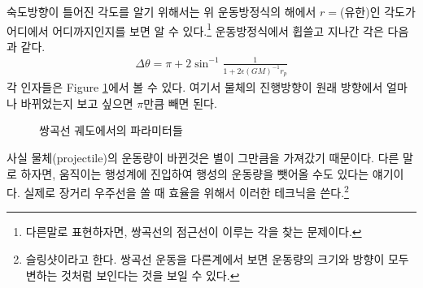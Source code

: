 \documentclass[9pt,twoside,openany]{amsbook}
\begin{document}
숙도방향이 틀어진 각도를 알기 위해서는 위 운동방정식의 해에서 $r=$(유한)인 각도가 어디에서 어디까지인지를 보면 알 수 있다.\footnote{다른말로 표현하자면, 쌍곡선의 점근선이 이루는 각을 찾는 문제이다.}
운동방정식에서 휩쓸고 지나간 각은 다음과 같다.
\begin{align}
	\Delta \theta = \pi + 2\sin^{-1}\frac{1}{{1+2\epsilon (GM)^{-1}r_p}}
\end{align}
각 인자들은 Figure \ref{fig:hyperbola}에서 볼 수 있다. 여기서 물체의 진행방향이 원래 방향에서 얼마나 바뀌었는지 보고 싶으면 $\pi$만큼 빼면 된다.
\begin{figure}[h]
\caption{쌍곡선 궤도에서의 파라미터들}
\label{fig:hyperbola}
\end{figure}

사실 물체(projectile)의 운동량이 바뀐것은 별이 그만큼을 가져갔기 때문이다. 다른 말로 하자면, 움직이는 행성계에 진입하여 행성의 운동량을 뺏어올 수도 있다는 얘기이다. 실제로 장거리 우주선을 쏠 때 효율을 위해서 이러한 테크닉을 쓴다.\footnote{슬링샷이라고 한다. 쌍곡선 운동을 다른계에서 보면 운동량의 크기와 방향이 모두 변하는 것처럼 보인다는 것을 보일 수 있다.}







\end{document}
